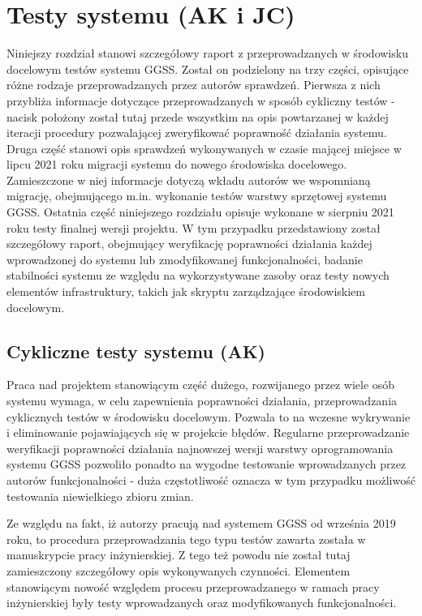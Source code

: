 \chapter{Testy systemu (AK i JC)}
\label{cha:tests}

\graphicspath{{6_tests/static/}}

Niniejszy rozdział stanowi szczegółowy raport z przeprowadzanych w środowisku docelowym testów systemu GGSS. Został on podzielony na trzy części, opisujące różne rodzaje przeprowadzanych przez autorów sprawdzeń. Pierwsza z nich przybliża informacje dotyczące przeprowadzanych w sposób cykliczny testów - nacisk położony został tutaj przede wszystkim na opis powtarzanej w każdej iteracji procedury pozwalającej zweryfikować poprawność działania systemu. Druga część stanowi opis sprawdzeń wykonywanych w czasie mającej miejsce w lipcu 2021 roku migracji systemu do nowego środowiska docelowego. Zamieszczone w niej informacje dotyczą wkładu autorów we wspomnianą migrację, obejmującego m.in. wykonanie testów warstwy sprzętowej systemu GGSS. Ostatnia część niniejszego rozdziału opisuje wykonane w sierpniu 2021 roku testy finalnej wersji projektu. W tym przypadku przedstawiony został szczegółowy raport, obejmujący weryfikację poprawności działania każdej wprowadzonej do systemu lub zmodyfikowanej funkcjonalności, badanie stabilności systemu ze względu na wykorzystywane zasoby oraz testy nowych elementów infrastruktury, takich jak skryptu zarządzające środowiskiem docelowym.

\section{Cykliczne testy systemu (AK)}
Praca nad projektem stanowiącym część dużego, rozwijanego przez wiele osób systemu wymaga, w celu zapewnienia poprawności działania, przeprowadzania cyklicznych testów w środowisku docelowym. Pozwala to na wczesne wykrywanie i eliminowanie pojawiających się w projekcie błędów. Regularne przeprowadzanie weryfikacji poprawności działania najnowszej wersji warstwy oprogramowania systemu GGSS pozwoliło ponadto na wygodne testowanie wprowadzanych przez autorów funkcjonalności - duża częstotliwość oznacza w tym przypadku możliwość testowania niewielkiego zbioru zmian.

Ze względu na fakt, iż autorzy pracują nad systemem GGSS od września 2019 roku, to procedura przeprowadzania tego typu testów zawarta została w manuskrypcie pracy inżynierskiej. Z tego też powodu nie został tutaj zamieszczony szczegółowy opis wykonywanych czynności. Elementem stanowiącym nowość względem procesu przeprowadzanego w ramach pracy inżynierskiej były testy wprowadzanych oraz modyfikowanych funkcjonalności. 


